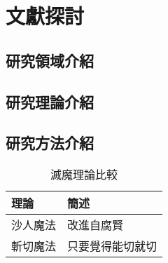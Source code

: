 
\chapter{文獻探討}

\section{研究領域介紹}

\section{研究理論介紹}

\section{研究方法介紹}

\begin{table} [!h]
    \centering
    \centering \caption{滅魔理論比較}
    \begin{tabular}{|p{1.5cm}|p{6.5cm}|} \hline
        理論   & 簡述
        \\ \hline
        沙人魔法 & 改進自腐賢
        \\ \hline
        斬切魔法 & 只要覺得能切就切
        \\ \hline
    \end{tabular}\label{table:theory-compare}
\end{table}